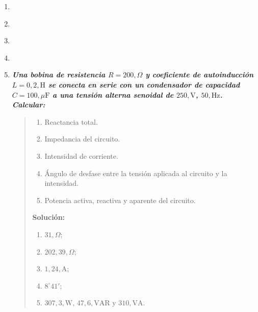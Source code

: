 \documentclass[spanish,openany]{report}
\begin{document}
\begin{enumerate}
	\item
		\begin{quote}
		\end{quote}
		
	\item
		\begin{quote}
		\end{quote}
		
	\item
		\begin{quote}
		\end{quote}
		
	\item
		\begin{quote}
		\end{quote}
		
	\item\textbf{\textit{{Una bobina de resistencia $R = 200 , \Omega$ y coeficiente de autoinducción $L = 0,2 , \mathrm{H}$ se conecta en serie con un condensador de capacidad $C = 100 , \mu\mathrm{F}$ a una tensión alterna senoidal de $250 , \mathrm{V}$, $50 , \mathrm{Hz}$. Calcular:}}}
		\begin{quote}
		\begin{enumerate}[label=\alph*)]
				\item Reactancia total.
				\item Impedancia del circuito.
				\item Intensidad de corriente.
				\item Ángulo de desfase entre la tensión aplicada al circuito y la intensidad.
				\item Potencia activa, reactiva y aparente del circuito.
			\end{enumerate}
			\textbf{Solución:}
			\begin{enumerate}[label=\alph*)]
				\item $31 , \Omega$;
				\item $202,39 , \Omega$;
				\item $1,24 , \mathrm{A}$;
				\item $8^\circ 41'$;
				\item $307,3 , \mathrm{W}$, $47,6 , \mathrm{VAR}$ y $310 , \mathrm{VA}$.
			\end{enumerate}

		\end{quote}
		

\end{enumerate}
\end{document}
